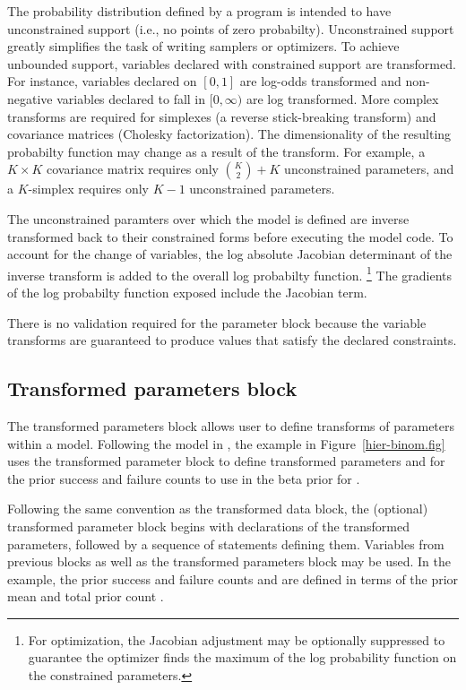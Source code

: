 \documentclass[article]{jss}
\begin{document}
The probability distribution defined by a  program is
intended to have unconstrained support (i.e., no points of zero
probabilty).  Unconstrained support greatly simplifies the task of
writing samplers or optimizers.  To achieve unbounded support,
variables declared with constrained support are transformed.  For
instance, variables declared on $[0,1]$ are log-odds transformed and
non-negative variables declared to fall in $[0,\infty)$ are log
transformed.  More complex transforms are required for simplexes (a
reverse stick-breaking transform) and covariance matrices (Cholesky
factorization).  The dimensionality of the resulting probabilty
function may change as a result of the transform. For example, a $K
\times K$ covariance matrix requires only ${K \choose 2} + K$
unconstrained parameters, and a $K$-simplex requires only $K-1$
unconstrained parameters.

The unconstrained paramters over which the model is defined are
inverse transformed back to their constrained forms before executing
the model code.  To account for the change of variables, the log
absolute Jacobian determinant of the inverse transform is added to the
overall log probabilty function.%
%
\footnote{For optimization, the Jacobian adjustment may be optionally
  suppressed to guarantee the optimizer finds the maximum of the log
  probability function on the constrained parameters.}
%
The gradients of the log probabilty function exposed include the
Jacobian term.  

There is no validation required for the parameter block because the
variable transforms are guaranteed to produce values that satisfy the
declared constraints.


\subsection{Transformed parameters block}

The transformed parameters block allows user to define transforms of
parameters within a model.  Following the model in
\citep{GelmanEtAl:2013}, the example in Figure~\ref{hier-binom.fig}
uses the transformed parameter block to define transformed parameters
 and  for the prior success and failure counts
to use in the beta prior for .  

Following the same convention as the transformed data block, the
(optional) transformed parameter block begins with declarations of the
transformed parameters, followed by a sequence of statements defining
them.  Variables from previous blocks as well as the transformed
parameters block may be used.  In the example, the prior success and
failure counts  and  are defined in terms of
the prior mean  and total prior count .
\end{document}
